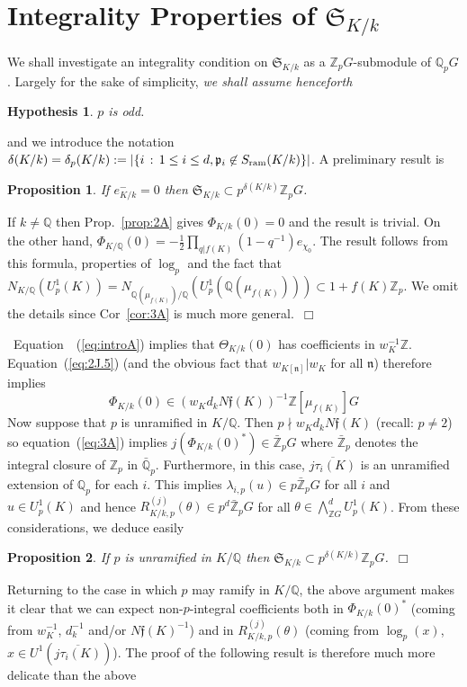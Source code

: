 \documentclass[12pt]{article}
\newtheorem{hyp}{Hypothesis}[section]
\newtheorem{prop}{Proposition}[section]
\newcounter{rem}[section]%
\newcommand{\barbbQ}{\ensuremath{\bar{\bbQ}}}
\newcommand{\bbQ}{\ensuremath{\mathbb{Q}}}
\newcommand{\bbZ}{\ensuremath{\mathbb{Z}}}
\newcommand{\beql}[1]{\begin{equation}\label{#1}}
\newcommand{\eeq}{\end{equation}}
\newcommand{\ePf}{\hspace*{\fill}~$\Box$\vertsp\par}%
\newcommand{\ff}{\ensuremath{\mathfrak{f}}}
\newcommand{\fn}{\ensuremath{\mathfrak{n}}}
\newcommand{\fp}{\ensuremath{\mathfrak{p}}}
\newcommand{\fS}{\ensuremath{\mathfrak{S}}}
\newcommand{\half}{\frac{1}{2}}
\newcommand{\inv}{^{-1}}%
\newcommand{\ndiv}{\nmid}
\newcommand{\nin}{\not\in}
\newcommand{\refeq}[1]{~(\ref{eq:#1})}
\newcommand{\rem}{\refstepcounter{rem}\noindent{\sc Remark \therem}}%
\renewcommand{\therem}{\thesection.\arabic{rem}}
\newcommand{\vertsp}{\vspace{1ex}}
\newcommand{\PhiKko}{\ensuremath{\Phi_{K/k}(0)}}
\newcommand{\PhiKkoa}{\ensuremath{\Phi_{K/k}(0)^\ast}}
\newcommand{\SKk}{\ensuremath{\fS_{K/k}}}
\begin{document}
\section{Integrality Properties of $\SKk$}\label{sec:integrality}
We shall investigate an integrality condition on $\SKk$ as
a $\bbZ_p G$-submodule of $\bbQ_p G$.
Largely for the sake of simplicity, \emph{we shall assume henceforth}
\begin{hyp}
$p$ is odd.
\end{hyp}
and we introduce the notation $\delta(K/k)=\delta_p(K/k):=
|\{i\,:\, 1\leq i\leq d,\fp_i\nin S_{\rm ram}(K/k)\}|$. A preliminary
result is
\begin{prop}\label{prop:3A}
If $e_{K/k}^-=0$ then $\SKk\subset p^{\delta(K/k)}\bbZ_p G$.
\end{prop}
If $k\neq \bbQ$ then Prop.~\ref{prop:2A} gives $\PhiKko=0$ and the result is trivial.
On the other hand,
$\Phi_{K/\bbQ}(0)=-\half\prod_{q|f(K)}(1-q\inv)e_{\chi_0}$.
The result follows from this formula, properties of $\log_p$ and the fact that
$N_{K/\bbQ}(U^1_p(K))=N_{\bbQ(\mu_{f(K)})/\bbQ}(U^1_p(\bbQ(\mu_{f(K)})))
\subset 1+f(K)\bbZ_p$. We omit the details
since Cor~\ref{cor:3A}
is much more general.\ePf
\noindent\
Equation~\refeq{introA} implies that $\Theta_{K/k}(0)$ has coefficients in
$w_K\inv\bbZ$. Equation\refeq{2J.5} (and the obvious fact that $w_{K[\fn]}|w_K$
for all $\fn$) therefore implies
\beql{eq:3A}
\PhiKko\in(w_Kd_kN\ff(K))\inv\bbZ[\mu_{f(K)}]G
\eeq
Now suppose that $p$ is unramified in $K/\bbQ$. Then
$p\ndiv w_Kd_k N\ff(K)$ (recall: $p\neq 2$) so equation\refeq{3A} implies
$j(\PhiKkoa)\in\bar{\bbZ}_p G$ where $\bar{\bbZ}_p$ denotes the
integral closure of $\bbZ_p$ in $\barbbQ_p$. Furthermore, in this case,
$\overline{j\tau_i(K)}$ is an unramified
extension of $\bbQ_p$ for each $i$. This implies
$\lambda_{i,p}(u)\in p\bar{\bbZ}_p G$ for all $i$ and $u\in U^1_p(K)$ and
hence $R^{(j)}_{K/k,p}(\theta)\in p^d\bar{\bbZ}_p G$
for all $\theta\in\bigwedge_{\bbZ G}^dU^1_p(K)$. From these considerations, we deduce easily
\begin{prop}\label{prop:unram}
If $p$ is unramified in $K/\bbQ$ then
$\SKk\subset p^{\delta(K/k)}\bbZ_p G$.\ePf
\end{prop}
Returning to the case in which $p$ may ramify in $K/\bbQ$,
the above argument makes it clear that we can expect non-$p$-integral
coefficients both in $\PhiKkoa$ (coming from $w_K\inv$, $d_k\inv$ and/or $N\ff(K)\inv$)
and in $R^{(j)}_{K/k,p}(\theta)$ (coming from $\log_p(x)$, $x\in U^1(\overline{j\tau_i(K)})$).
The proof of the following result is therefore much more delicate than the above
\end{document}
